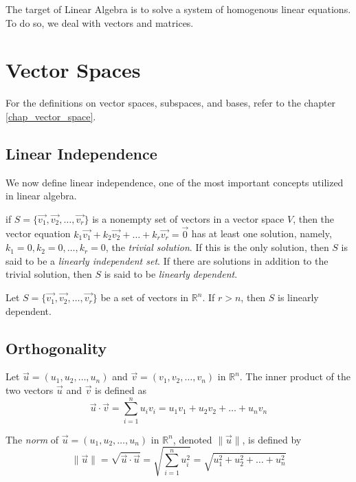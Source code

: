 \documentclass{report}
\begin{document}
The target of Linear Algebra is to solve a system of homogenous linear equations. To do so, we deal with vectors and matrices.
	\section{Vector Spaces}
		For the definitions on vector spaces, subspaces, and bases, refer to the chapter \ref{chap_vector_space}.
		\subsection{Linear Independence}
		We now define linear independence, one of the most important concepts utilized in linear algebra.
		\begin{defn}
			if $S=\{\vec{v_1}, \vec{v_2}, \dots, \vec{v_r}\}$ is a nonempty set of vectors in a vector space $V$, then the vector equation $k_1\vec{v_1}+k_2\vec{v_2}+\dots+k_r\vec{v_r}=\vec{0}$ has at least one solution, namely, $k_1=0, k_2=0, \dots, k_r=0$, the \emph{trivial solution}. If this is the only solution, then $S$ is said to be a \emph{linearly independent set}. If there are solutions in addition to the trivial solution, then $S$ is said to be \emph{linearly dependent}.
		\end{defn}
		
		\begin{thm}
			Let $S=\{\vec{v_1}, \vec{v_2}, \dots, \vec{v_r}\}$ be a set of vectors in $\mathbb{R}^n$. If $r>n$, then $S$ is linearly dependent.
		\end{thm}
		
		\subsection{Orthogonality}
		\begin{defn}
			Let $\vec{u}=(u_1,u_2,\dots,u_n)$ and $\vec{v}=(v_1,v_2,\dots,v_n)$ in $\mathbb{R}^n$. The inner product of the two vectors $\vec{u}$ and $\vec{v}$ is defined as
			\begin{displaymath}
				\vec{u}\cdot\vec{v}=\sum_{i=1}^{n}u_iv_i=u_1v_1+u_2v_2+\dots+u_nv_n
			\end{displaymath}
		\end{defn}
		
		\begin{defn}[Norm]
			The \emph{norm} of $\vec{u}=(u_1,u_2,\dots,u_n)$ in $\mathbb{R}^n$, denoted $\|\vec{u}\|$, is defined by
			\begin{displaymath}
			\|\vec{u}\|=\sqrt{\vec{u} \cdot \vec{u}}=\sqrt{\sum_{i=1}^{n}u_i^2}=\sqrt{u_1^2+u_2^2+\dots+u_n^2}
			\end{displaymath}
		\end{defn}
		
\end{document}
